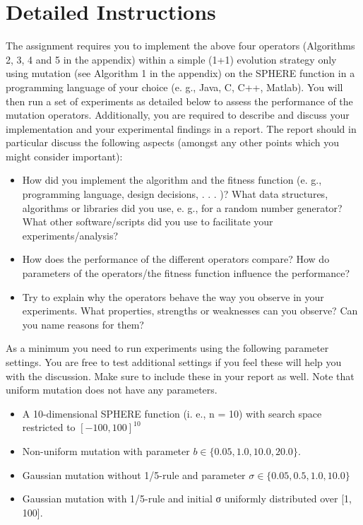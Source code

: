 \documentclass{article}
\begin{document}
    \section{Detailed Instructions}
The assignment requires you to implement the above four operators (Algorithms 2, 3, 4 and 5 in
the appendix) within a simple (1+1) evolution strategy only using mutation (see Algorithm 1 in
the appendix) on the SPHERE function in a programming language of your choice (e. g., Java, C,
C++, Matlab). You will then run a set of experiments as detailed below to assess the performance
of the mutation operators.
Additionally, you are required to describe and discuss your implementation and your experimental
findings in a report. The report should in particular discuss the following aspects (amongst any
other points which you might consider important):

\begin{itemize}

  \item How did you implement the algorithm and the fitness function (e. g., programming language,
design decisions, . . . )? What data structures, algorithms or libraries did you use, e. g., for
a random number generator? What other software/scripts did you use to facilitate your
experiments/analysis?
  \item How does the performance of the different operators compare? How do parameters of the
operators/the fitness function influence the performance?
  \item Try to explain why the operators behave the way you observe in your experiments. What
properties, strengths or weaknesses can you observe? Can you name reasons for them?

\end{itemize}

As a minimum you need to run experiments using the following parameter settings. You are free
to test additional settings if you feel these will help you with the discussion. Make sure to include
these in your report as well. Note that uniform mutation does not have any parameters.

\begin{itemize}
	\item A 10-dimensional SPHERE function (i. e., n = 10) with search space restricted to $[-100, 100]^{10}$
	\item Non-uniform mutation with parameter $b \in \{0.05, 1.0, 10.0, 20.0\}$.
	\item Gaussian mutation without 1/5-rule and parameter $\sigma \in \{0.05, 0.5, 1.0, 10.0\}$
	\item Gaussian mutation with 1/5-rule and initial σ uniformly distributed over [1, 100].
\end{itemize}
\end{document}

